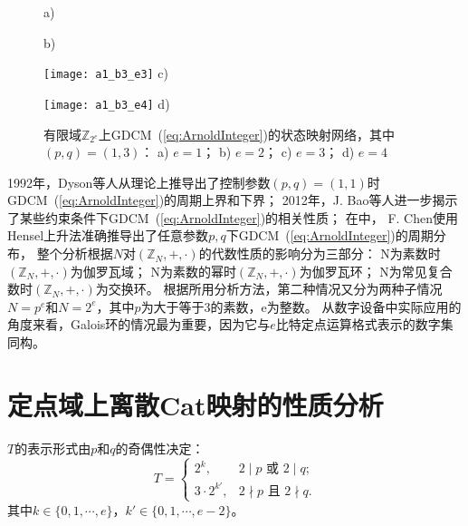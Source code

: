 \begin{figure*}[!htb]
\centering
\begin{minipage}{0.45\FourImW}
\centering\hfill
\raisebox{0.25\FourImW}{
\texttt{[image: a1\_b1\_e1]}}
a)
\end{minipage}\hspace{6em}
\begin{minipage}{0.85\FourImW}
\centering
\raisebox{0.15\FourImW}{\hfill
\texttt{[image: a1\_b3\_e2]}}
b)
\end{minipage} \hspace{6em}
\begin{minipage}{1.25\FourImW}
\centering
\texttt{[image: a1\_b3\_e3]}
c)
\end{minipage}\hspace{\figsep}
\begin{minipage}{2\BigOneImW}
\centering
\texttt{[image: a1\_b3\_e4]}
d)
\end{minipage}
\caption{有限域$\mathbb{Z}_{2^e}$上GDCM~(\ref{eq:ArnoldInteger})的状态映射网络，其中$(p, q)=(1, 3)$：
a) $e=1$； b) $e=2$； c) $e=3$； d) $e=4$}
\label{fig:SMNcat}
\end{figure*}

1992年，Dyson等人从理论上推导出了控制参数$(p, q)=(1, 1)$时GDCM~(\ref{eq:ArnoldInteger})的周期上界和下界；
2012年，J. Bao等人进一步揭示了某些约束条件下GDCM~(\ref{eq:ArnoldInteger})的相关性质；
在中，
F. Chen使用Hensel上升法准确推导出了任意参数$p,q$下GDCM~(\ref{eq:ArnoldInteger})的周期分布，
整个分析根据$N$对$(\mathbb{Z}_{N}, +, \cdot)$的代数性质的影响分为三部分：
N为素数时$(\mathbb{Z}_{N}, +, \cdot)$为伽罗瓦域；
N为素数的幂时$(\mathbb{Z}_{N}, +, \cdot)$为伽罗瓦环；
N为常见复合数时$(\mathbb{Z}_{N}, +, \cdot)$为交换环。
根据所用分析方法，第二种情况又分为两种子情况$N=p^e$和$N=2^e$，其中$p$为大于等于3的素数，e为整数。
从数字设备中实际应用的角度来看，Galois环的情况最为重要，因为它与$e$比特定点运算格式表示的数字集同构。

\section{定点域上离散Cat映射的性质分析}

\begin{Property}
$T$的表示形式由$p$和$q$的奇偶性决定：
\begin{equation}
  T=
  \left.\begin{cases}
  2^k,           & 2\mid p \mbox{ 或~} 2\mid q;\\
  3\cdot 2^{k'}, & 2\nmid p \mbox{ 且~} 2\nmid q.
  \end{cases}\right.
  \label{eq:T}
\end{equation}
其中$k\in \{0, 1, \cdots, e\}$，$k'\in \{0, 1, \cdots, e-2\}$。
\label{prop:period}
\end{Property}

